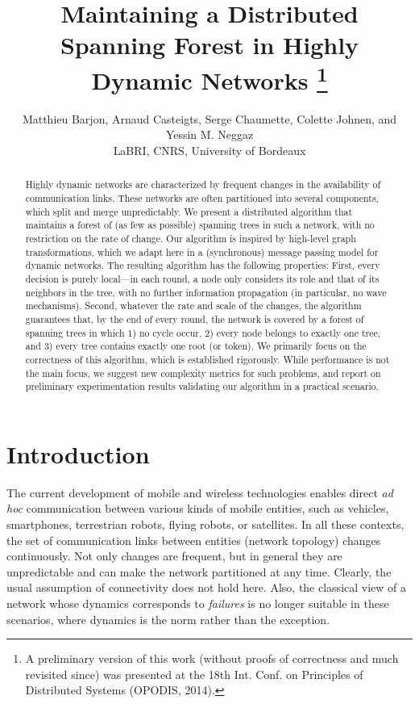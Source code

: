 \documentclass[twocolumn]{article}
\begin{document}
\title{Maintaining a Distributed Spanning Forest in Highly Dynamic Networks
\thanks{A preliminary version of this work (without proofs of correctness and much revisited since) was presented at the 18th Int. Conf. on Principles of Distributed Systems (OPODIS, 2014).}
}

\author{Matthieu Barjon, Arnaud Casteigts, Serge Chaumette, Colette Johnen, and Yessin M. Neggaz\bigskip\\
LaBRI, CNRS, University of Bordeaux}
\date{}

\maketitle

\begin{abstract}
  Highly dynamic networks are characterized by frequent changes in the availability of communication links. These networks are often partitioned into several components, which split and merge unpredictably. We present a distributed algorithm that maintains a forest of (as few as possible) spanning trees in such a network, with no restriction on the rate of change. Our algorithm is inspired by high-level graph transformations, which we adapt here in a (synchronous) message passing model for dynamic networks. The resulting algorithm
has the following properties: First, every decision is purely local---in each round, a node only considers its role and that of its neighbors in the tree, with no further information propagation (in particular, no wave mechanisms). Second, whatever the rate and scale of the changes, the algorithm guarantees that, by the end of every round, the network is covered by a forest of spanning trees in which 1) no cycle occur, 2) every node belongs to exactly one tree, and 3) every tree contains exactly one root (or token). 
We primarily focus on the correctness of this algorithm, which is established rigorously. While performance is not the main focus, we suggest new complexity metrics for such problems, and report on preliminary experimentation results validating our algorithm in a practical scenario.
\end{abstract}



\section{Introduction}

The current development of mobile and wireless technologies enables direct {\it ad hoc} communication between various kinds of mobile entities, such as vehicles, smartphones, terrestrian robots, flying robots, or satellites. In all these contexts, the set of communication links between entities (network topology) changes continuously. Not only changes are frequent, but in general they are unpredictable and can make the network partitioned at any time. Clearly, the usual assumption of connectivity does not hold here. Also, the classical view of a network whose dynamics corresponds to {\em failures} is no longer suitable in these scenarios, where dynamics is the norm rather than the exception. 
\end{document}
